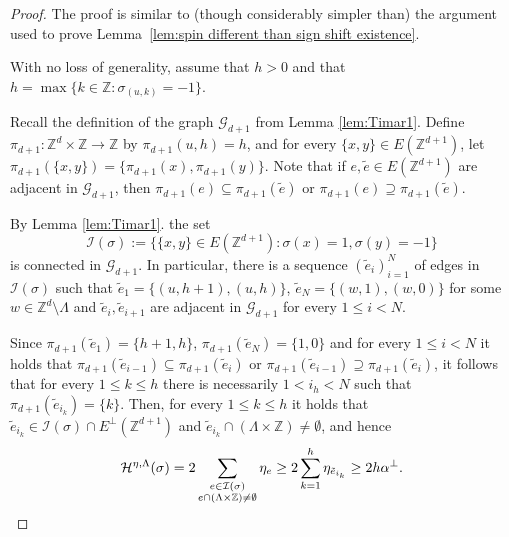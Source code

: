 \documentclass[11pt, reqno]{amsart}
\numberwithin{equation}{section}
\begin{document}
\begin{proof}
The proof is similar to (though considerably simpler than) the argument used to prove Lemma~\ref{lem:spin different than sign shift existence}.

With no loss of generality, assume that $h>0$ and that $h=\max\{k\in{\mathbb Z}\colon \sigma_{(u,k)}=-1\}$.

Recall the definition of the graph ${\mathcal G}_{d+1}$ from Lemma \ref{lem:Timar1}.
Define $\pi_{d+1}:{\mathbb Z}^d\times{\mathbb Z}\to{\mathbb Z}$ by $\pi_{d+1}(u,h)=h$, and for every $\{x,y\}\in E({\mathbb Z}^{d+1})$, let $\pi_{d+1}(\{x,y\})=\{\pi_{d+1}(x),\pi_{d+1}(y)\}$.
Note that if $e,\tilde{e}\in E({\mathbb Z}^{d+1})$ are adjacent in ${\mathcal G}_{d+1}$, then $\pi_{d+1}(e)\subseteq\pi_{d+1}(\tilde{e})$ or $\pi_{d+1}(e)\supseteq\pi_{d+1}(\tilde{e})$.

By Lemma \ref{lem:Timar1}. the set 
$${\mathcal I}(\sigma):=\{\{x,y\}\in E({\mathbb Z}^{d+1})\colon \sigma(x)=1, \sigma(y)=-1\}$$ 
is connected in ${\mathcal G}_{d+1}$.
In particular, there is a sequence $(\tilde{e}_i)_{i=1}^N$ of edges in ${\mathcal I}(\sigma)$ such that $\tilde{e}_1=\{(u,h+1),(u,h)\}$, $\tilde{e}_N=\{(w,1),(w,0)\}$ for some $w\in {\mathbb Z}^d\setminus\Lambda$ and $\tilde{e}_i, \tilde{e}_{i+1}$ are adjacent in ${\mathcal G}_{d+1}$ for every $1\leq i<N$. 

Since $\pi_{d+1}(\tilde{e}_1)=\{h+1,h\}$, $\pi_{d+1}(\tilde{e}_N)=\{1,0\}$ and for every $1\leq i<N$ it holds that $\pi_{d+1}(\tilde{e}_{i-1})\subseteq\pi_{d+1}(\tilde{e}_i)$ or $\pi_{d+1}(\tilde{e}_{i-1})\supseteq\pi_{d+1}(\tilde{e}_i)$, it follows that for every $1\leq k\leq h$ there is necessarily $1< i_h< N$ such that $\pi_{d+1}(\tilde{e}_{i_k})=\{k\}$. 
Then, for every $1\leq k\leq h$ it holds that
$\tilde{e}_{i_k}\in {\mathcal I}(\sigma)\cap E^{\perp}({\mathbb Z}^{d+1})$ and $\tilde{e}_{i_k}\cap(\Lambda\times{\mathbb Z})\neq\emptyset$, and hence 
\begin{equation*}
\mathcal{H}^{\eta,\Lambda}(\sigma )=2\sum_{\substack{e\in {\mathcal I}(\sigma)\\e\cap(\Lambda\times{\mathbb Z})\neq\emptyset}}\eta_e \geq 2\sum_{k=1}^h\eta_{\tilde{e}_{i_k}}\geq 2h \alpha^{\perp}.
\qedhere\end{equation*}
\end{proof}
\end{document}
